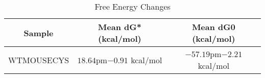 \documentclass{article}
\begin{document}
\begin{table}[ht]
    \centering
    \begin{tabular}{|c|c|c|}
    \hline
    Sample & Mean dG* (kcal/mol) & Mean dG0 (kcal/mol) \\
    \hline
    WTMOUSECYS & $18.64 $pm$- 0.91$ kcal/mol & $-57.19 $pm$- 2.21$ kcal/mol \\
    \hline
    \end{tabular}
    \caption{Free Energy Changes}
\end{table}
\end{document}
